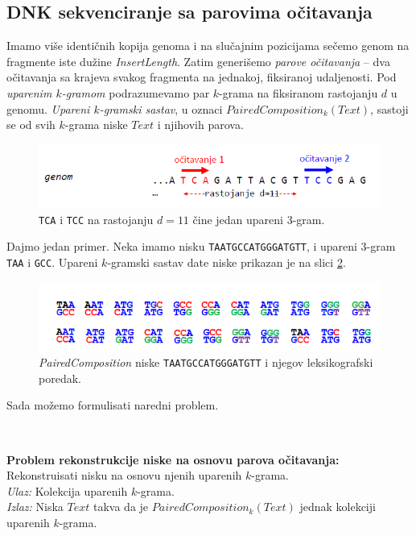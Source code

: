 \subsection{DNK sekvenciranje sa parovima očitavanja} 

Imamo više identičnih kopija genoma i na slučajnim pozicijama sečemo genom na fragmente iste dužine \textit{InsertLength}. Zatim generišemo \emph{parove očitavanja} -- dva očitavanja sa krajeva svakog fragmenta na jednakoj, fiksiranoj udaljenosti. Pod \emph{uparenim $k$-gramom} podrazumevamo par $k$-grama na fiksiranom rastojanju $d$ u genomu. \emph{Upareni $k$-gramski sastav}, u oznaci $PairedComposition_k(Text)$, sastoji se od svih $k$-grama niske $Text$ i njihovih parova.

\begin{figure}[h]
	\centering
	\includegraphics[width=1\textwidth]{poglavlja/3/slike/upareni_kgram.png}
	\caption{\texttt{TCA} i \texttt{TCC} na rastojanju $d=11$ čine jedan upareni 3-gram.}
	\label{slika:upareni}
\end{figure} 

Dajmo jedan primer. Neka imamo nisku \texttt{TAATGCCATGGGATGTT}, i upareni 3-gram \texttt{TAA} i \texttt{GCC}. Upareni $k$-gramski sastav date niske prikazan je na slici \ref{slika:upareni3}.

\begin{figure}[h]
	\centering
	\includegraphics[width=1\textwidth]{poglavlja/3/slike/upareni_3gram.png}
	\caption{\emph{PairedComposition} niske \texttt{TAATGCCATGGGATGTT} i njegov leksikografski poredak.}
	\label{slika:upareni3}
\end{figure} 

Sada mo\v zemo formulisati naredni problem.

~ \\
\begin{tcolorbox}
	\textbf{Problem rekonstrukcije niske na osnovu parova očitavanja:}	Rekonstruisati nisku na osnovu njenih uparenih $k$-grama. \\
	\textit{Ulaz:} Kolekcija uparenih $k$-grama.\\
	\textit{Izlaz:} Niska $Text$ takva da je $PairedComposition_k(Text)$ jednak kolekciji uparenih $k$-grama. 
\end{tcolorbox}


